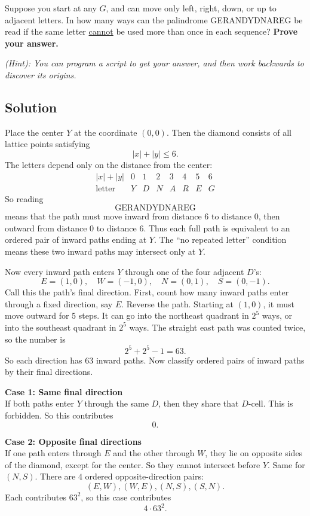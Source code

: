 \documentclass{article}
\begin{document}
    Suppose you start at any $G$, and can move only left, right, down, or up to adjacent letters. In how many ways can the palindrome GERANDYDNAREG be read if the same letter \underline{cannot} be used more than once in each sequence? \textbf{Prove your answer.}

       \vspace{2mm}
    \textit{(Hint): You can program a script to get your answer, and then work backwards to discover its origins.}

\subsection*{Solution}

Place the center $Y$ at the coordinate $(0,0)$. Then the diamond consists of all lattice points satisfying
\[
|x|+|y|\le 6.
\]
The letters depend only on the distance from the center:
\[
\begin{array}{c|ccccccc}
|x|+|y| & 0 & 1 & 2 & 3 & 4 & 5 & 6\\
\hline
\text{letter} & Y & D & N & A & R & E & G
\end{array}
\]
So reading
\[
\text{GERANDYDNAREG}
\]
means that the path must move inward from distance $6$ to distance $0$, then outward from distance $0$ to distance $6$. Thus each full path is equivalent to an ordered pair of inward paths ending at $Y$. The ``no repeated letter'' condition means these two inward paths may intersect only at $Y$.

\vspace{2mm}
Now every inward path enters $Y$ through one of the four adjacent $D$'s:
\[
E=(1,0),\quad W=(-1,0),\quad N=(0,1),\quad S=(0,-1).
\]
Call this the path's final direction. First, count how many inward paths enter through a fixed direction, say $E$. Reverse the path. Starting at $(1,0)$, it must move outward for $5$ steps. It can go into the northeast quadrant in $2^5$ ways, or into the southeast quadrant in $2^5$ ways. The straight east path was counted twice, so the number is
\[
2^5+2^5-1=63.
\]
So each direction has $63$ inward paths. Now classify ordered pairs of inward paths by their final directions.

\vspace{2mm}
\textbf{Case 1: Same final direction} \\
If both paths enter $Y$ through the same $D$, then they share that $D$-cell. This is forbidden. So this contributes
\[
0.
\]

\textbf{Case 2: Opposite final directions} \\
If one path enters through $E$ and the other through $W$, they lie on opposite sides of the diamond, except for the center. So they cannot intersect before $Y$. Same for $(N,S)$. There are $4$ ordered opposite-direction pairs:
\[
(E,W),(W,E),(N,S),(S,N).
\]
Each contributes $63^2$, so this case contributes
\[
4\cdot 63^2.
\]
\end{document}
